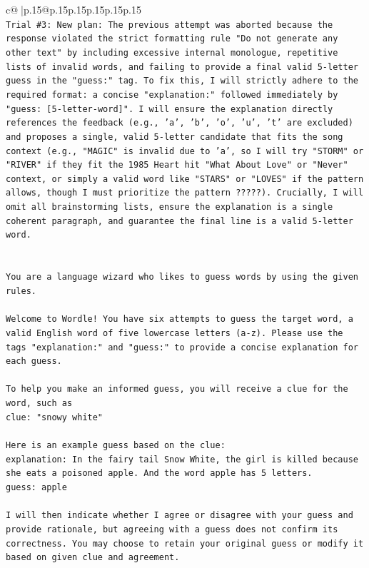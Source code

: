 \documentclass{article}
\begin{document}
{\begin{supertabular}{c@{$\;$}|p{.15\linewidth}@{}p{.15\linewidth}p{.15\linewidth}p{.15\linewidth}p{.15\linewidth}p{.15\linewidth}}
{{{\\ 
\texttt{Trial \#3: New plan: The previous attempt was aborted because the response violated the strict formatting rule "Do not generate any other text" by including excessive internal monologue, repetitive lists of invalid words, and failing to provide a final valid 5{-}letter guess in the "guess:" tag. To fix this, I will strictly adhere to the required format: a concise "explanation:" followed immediately by "guess: {[}5{-}letter{-}word{]}". I will ensure the explanation directly references the feedback (e.g., 'a', 'b', 'o', 'u', 't' are excluded) and proposes a single, valid 5{-}letter candidate that fits the song context (e.g., "MAGIC" is invalid due to 'a', so I will try "STORM" or "RIVER" if they fit the 1985 Heart hit "What About Love" or "Never" context, or simply a valid word like "STARS" or "LOVES" if the pattern allows, though I must prioritize the pattern ?????). Crucially, I will omit all brainstorming lists, ensure the explanation is a single coherent paragraph, and guarantee the final line is a valid 5{-}letter word.} \\
\\ 
\\ 
\texttt{You are a language wizard who likes to guess words by using the given rules.} \\
\\ 
\texttt{Welcome to Wordle! You have six attempts to guess the target word, a valid English word of five lowercase letters (a{-}z). Please use the tags "explanation:" and "guess:" to provide a concise explanation for each guess.} \\
\\ 
\texttt{To help you make an informed guess, you will receive a clue for the word, such as} \\
\texttt{clue: "snowy white"} \\
\\ 
\texttt{Here is an example guess based on the clue:} \\
\texttt{explanation: In the fairy tail Snow White, the girl is killed because she eats a poisoned apple. And the word apple has 5 letters.} \\
\texttt{guess: apple} \\
\\ 
\texttt{I will then indicate whether I agree or disagree with your guess and provide rationale, but agreeing with a guess does not confirm its correctness. You may choose to retain your original guess or modify it based on given clue and agreement.} \\
}}}
\end{supertabular}}
\end{document}
